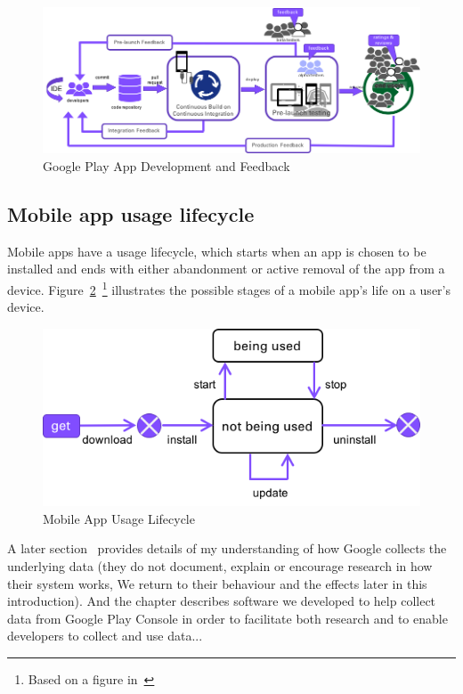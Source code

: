 \begin{figure}
    \centering
    \includegraphics[width=13cm]{images/google-play-app-development.png}
    \caption{Google Play App Development and Feedback}
    \label{fig:google-play-app-development-and-feedback}
\end{figure}


\subsection{Mobile app usage lifecycle}
Mobile apps have a usage lifecycle, which starts when an app is chosen to be installed and ends with either abandonment or active removal of the app from a device. Figure~\ref{fig:mobile_app_usage_lifecycle}~\footnote{Based on a figure in~\cite{bohmer2011falling_asleep_with_angry_birds}} illustrates the possible stages of a mobile app's life on a user's device.

\begin{figure}[ht]
    \centering
    \includegraphics[width=12cm]{images/mobile_app_usage_lifecycle.png}
    \caption{Mobile App Usage Lifecycle}
    \label{fig:mobile_app_usage_lifecycle}
\end{figure}

A later section~\href{platform-level-analytics}{\emph{}} provides details of my understanding of how Google collects the underlying data (they do not document, explain or encourage research in how their system works, We return to their behaviour and the effects later in this introduction). And the chapter \href{chapter-software-we-developed-for-google-play-console}{\emph{}} describes software we developed to help collect data from Google Play Console in order to facilitate both research and to enable developers to collect and use data...

